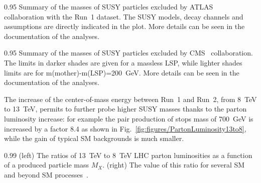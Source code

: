                  {0.95}       %
                 {Summary of the masses of SUSY particles excluded by ATLAS~\cite{website:SUSYresRunIATLAS} collaboration with the Run~1 dataset. The SUSY models, decay channels and assumptions are directly indicated in the plot. More details can be seen in the documentation of the analyses. }


                 {0.95}       %
                 {Summary of the masses of SUSY particles excluded by CMS~\cite{website:SUSYresRunI} collaboration. The limits in darker shades are given for a massless LSP, while lighter shades limits are for m(mother)-m(LSP)=200~GeV. More details can be seen in the documentation of the analyses. }

The increase of the center-of-mass energy between Run~1 and Run~2, from 8~TeV to 13~TeV, permits to further probe higher SUSY masses thanks to  the parton luminosity increase: for example the pair production of stops mass of 700~GeV is increased by a factor 8.4 as shown in Fig.~\ref{fig:figures/PartonLuminosity13to8}, while the gain of typical SM backgrounds is much smaller.

                 {0.99}       %
                 {(left) The ratios of 13~TeV to 8~TeV LHC parton luminosities as a function of a produced particle mass $M_{X}$. (right) The value of this ratio for several SM and beyond SM processes~\cite{Hoecker:2236645}.}





